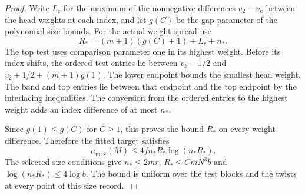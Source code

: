 \begin{proof}
Write \(L_c\) for the maximum of the nonnegative differences
\(v_2-v_k\) between the head weights at each index, and
let \(g(C)\) be the gap parameter of the polynomial size
bounds. 
For the actual weight spread use
\[
       R_*=(m+1)(g(C)+1)+L_c+n_*.
\]
The top test uses comparison parameter one in its highest
weight. Before its index shifts, the ordered test entries
lie between \(v_k-1/2\) and
\(v_2+1/2+(m+1)g(1)\). The lower endpoint bounds the
smallest head weight. The band and top entries lie
between that endpoint and the top endpoint by the
interlacing inequalities. The conversion from the ordered
entries to the highest weight adds an index difference
of at most \(n_*\).

Since \(g(1)\le g(C)\) for \(C\ge1\),
this proves the bound \(R_*\) on every weight difference.
Therefore the fitted target satisfies
\[
             \mu_{\max}(M)\le4fn_*R_*\log(n_*R_*).
\]
The selected size conditions give \(n_*\le2mr\),
\(R_*\le CmN^3b\) and \(\log(n_*R_*)\le4\log b\).
The bound is uniform over the test blocks and the twists
at every point of this size record.
\label{cor:fitted-test-slope-3}
\end{proof}

